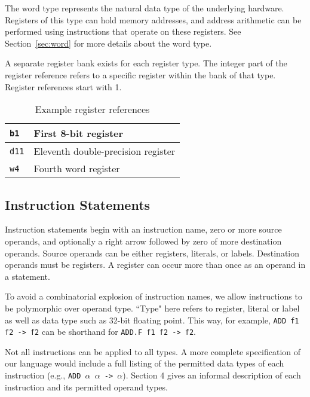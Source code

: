 The word type represents the natural data type of the underlying hardware.
Registers of this type can hold memory addresses, and address arithmetic
can be performed using instructions that operate on these registers.
See Section~\ref{sec:word} for more details about the word type.

A separate register bank exists for each register type. The integer
part of the register reference refers to a specific register
within the bank of that type. Register references start with 1.

\begin{table}[h!]
  \begin{center}
    \begin{tabular}{|l|l|}
      \hline
      \texttt{b1}  & First 8-bit register               \\ \hline
      \texttt{d11} & Eleventh double-precision register \\ \hline
      \texttt{w4}  & Fourth word register               \\ \hline
    \end{tabular}
  \end{center}
  \caption{Example register references}
\end{table}

\subsection{Instruction Statements}

Instruction statements begin with an instruction name, zero or
more source operands, and optionally a right arrow followed by
zero of more destination operands. Source operands can be either registers,
literals, or labels. Destination operands must be registers.
A register can occur more than once as an operand in a statement.

To avoid a combinatorial explosion of instruction names,
we allow instructions to be polymorphic over operand type.
``Type" here refers to register, literal or label as well
as data type such as 32-bit floating point.
This way, for example, \texttt{ADD f1 f2 -> f2} can be shorthand
for \texttt{ADD.F f1 f2 -> f2}.

Not all instructions can be applied to all types.
A more complete specification of our language would include
a full listing of the permitted data types of each instruction
(e.g., \texttt{ADD $\alpha$ $\alpha$ -> $\alpha$}). Section 4 gives an informal description of each instruction
and its permitted operand types.

